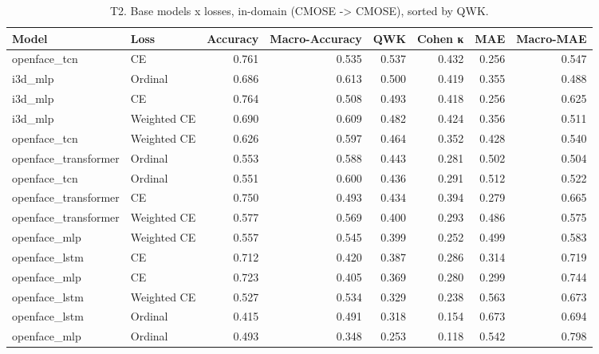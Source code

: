 \begin{table}
\caption{T2. Base models x losses, in-domain (CMOSE -> CMOSE), sorted by QWK.}
\label{tab:T2_base_indomain}
\begin{tabular}{llrrrrrr}
\toprule
Model & Loss & Accuracy & Macro-Accuracy & QWK & Cohen κ & MAE & Macro-MAE \\
\midrule
openface_tcn & CE & 0.761 & 0.535 & 0.537 & 0.432 & 0.256 & 0.547 \\
i3d_mlp & Ordinal & 0.686 & 0.613 & 0.500 & 0.419 & 0.355 & 0.488 \\
i3d_mlp & CE & 0.764 & 0.508 & 0.493 & 0.418 & 0.256 & 0.625 \\
i3d_mlp & Weighted CE & 0.690 & 0.609 & 0.482 & 0.424 & 0.356 & 0.511 \\
openface_tcn & Weighted CE & 0.626 & 0.597 & 0.464 & 0.352 & 0.428 & 0.540 \\
openface_transformer & Ordinal & 0.553 & 0.588 & 0.443 & 0.281 & 0.502 & 0.504 \\
openface_tcn & Ordinal & 0.551 & 0.600 & 0.436 & 0.291 & 0.512 & 0.522 \\
openface_transformer & CE & 0.750 & 0.493 & 0.434 & 0.394 & 0.279 & 0.665 \\
openface_transformer & Weighted CE & 0.577 & 0.569 & 0.400 & 0.293 & 0.486 & 0.575 \\
openface_mlp & Weighted CE & 0.557 & 0.545 & 0.399 & 0.252 & 0.499 & 0.583 \\
openface_lstm & CE & 0.712 & 0.420 & 0.387 & 0.286 & 0.314 & 0.719 \\
openface_mlp & CE & 0.723 & 0.405 & 0.369 & 0.280 & 0.299 & 0.744 \\
openface_lstm & Weighted CE & 0.527 & 0.534 & 0.329 & 0.238 & 0.563 & 0.673 \\
openface_lstm & Ordinal & 0.415 & 0.491 & 0.318 & 0.154 & 0.673 & 0.694 \\
openface_mlp & Ordinal & 0.493 & 0.348 & 0.253 & 0.118 & 0.542 & 0.798 \\
\bottomrule
\end{tabular}
\end{table}
